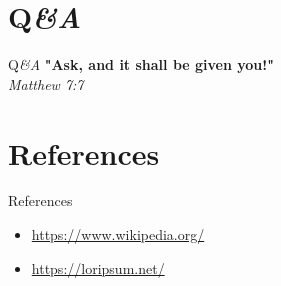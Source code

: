 \documentclass[10pt]{beamer}
\begin{document}
\section{Q\em\&A}
\begin{frame}{Q\em\&A}{} 
\textbf{"Ask, and it shall be given you!"}\centering\\
\em Matthew 7:7
\end{frame}
\section{References}
\begin{frame}{References}{} 
\begin{itemize}
\item\href{https://www.wikipedia.org/}{https://www.wikipedia.org/}
\item\href{https://loripsum.net/}{https://loripsum.net/}
\end{itemize}
\end{frame}

{\1
\begin{frame}
\end{frame}}
\end{document}
